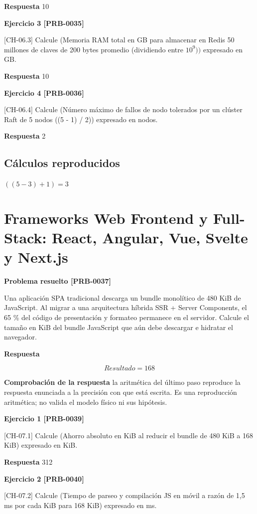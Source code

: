 \documentclass{book}
\begin{document}
\noindent\textbf{Respuesta} 10

\noindent\textbf{Ejercicio 3 [PRB-0035]}

[CH-06.3] Calcule (Memoria RAM total en GB para almacenar en Redis 50 millones de claves de 200 bytes promedio (dividiendo entre \(10^9))\) expresado en GB.

\noindent\textbf{Respuesta} 10

\noindent\textbf{Ejercicio 4 [PRB-0036]}

[CH-06.4] Calcule (Número máximo de fallos de nodo tolerados por un clúster Raft de 5 nodos ((5 - 1) / 2)) expresado en nodos.

\noindent\textbf{Respuesta} 2

\subsection*{Cálculos reproducidos}

\(\left(\left(5-3\right)+1\right) = 3\)

\section{Frameworks Web Frontend y Full-Stack: React, Angular, Vue, Svelte y Next.js}

\noindent\textbf{Problema resuelto [PRB-0037]}

Una aplicación SPA tradicional descarga un bundle monolítico de 480 KiB de JavaScript. Al migrar a una arquitectura híbrida SSR + Server Components, el 65 \% del código de presentación y formateo permanece en el servidor. Calcule el tamaño en KiB del bundle JavaScript que aún debe descargar e hidratar el navegador.

\noindent\textbf{Respuesta}

\[
Resultado = 168
\]

\noindent\textbf{Comprobación de la respuesta} la aritmética del último paso reproduce la respuesta enunciada a la precisión con que está escrita. Es una reproducción aritmética; no valida el modelo físico ni sus hipótesis.

\noindent\textbf{Ejercicio 1 [PRB-0039]}

[CH-07.1] Calcule (Ahorro absoluto en KiB al reducir el bundle de 480 KiB a 168 KiB) expresado en KiB.

\noindent\textbf{Respuesta} 312

\noindent\textbf{Ejercicio 2 [PRB-0040]}

[CH-07.2] Calcule (Tiempo de parseo y compilación JS en móvil a razón de 1,5 ms por cada KiB para 168 KiB) expresado en ms.
\end{document}
